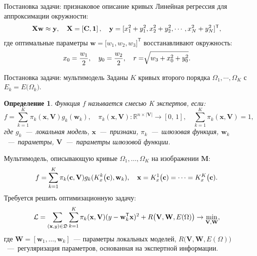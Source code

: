 \documentclass[10pt,pdf,hyperref={unicode}]{beamer}
\newtheorem{rusdefinition}{Определение}
\begin{document}
\begin{frame}{Постановка задачи: признаковое описание кривых}
Линейная регрессия для аппроксимации окружности:
\[
\setlength\abovedisplayskip{0pt}
\begin{aligned}
\textbf{X}\textbf{w} \approx \textbf{y},  \quad \textbf{X} = \left[\textbf{C}, \textbf{1}\right], \quad \textbf{y} = [x_1^2+y_1^2, x_2^2+y_2^2, \cdots, x_N^2+y_N^2]^{\mathsf{T}},
\end{aligned}
\setlength\belowdisplayskip{0pt}
\]
где оптимальные параметры $\textbf{w} = \bigr[w_1, w_2, w_3\bigr]^{\mathsf{T}}$ восстанавливают окружность:
\[
\setlength\abovedisplayskip{0pt}
\begin{aligned}
x_0 = \frac{w_1}{2}, \quad y_0 = \frac{w_2}{2}, \quad r = \sqrt[]{w_3+x_{0}^{2}+y_{0}^{2}}.
\end{aligned}
\setlength\belowdisplayskip{0pt}
\]


\end{frame}


\begin{frame}{Постановка задачи: мультимодель}
\justifying
Заданы $K$ кривых второго порядка $\Omega_1, \cdots, \Omega_K$ с $E_k = E\bigr(\Omega_k\bigr)$.

\begin{rusdefinition}
Функция $f$ называется смесью K экспертов, если:
\[
	f = \sum\limits_{k = 1}^{K}\pi_k(\mathbf{x}, \mathbf{V})g_k(\mathbf{w}_k),  \quad \pi_k(\mathbf{x}, \mathbf{V}): \mathbb{R}^{n\times |\mathbf{V}|} \rightarrow [0, \, 1], \quad \sum\limits_{k = 1}^{K}\pi_k(\mathbf{x}, \mathbf{V}) = 1, 
\]
где $g_k$~---~локальная модель, $\mathbf{x}$~---~признаки, $\pi_k$~---~шлюзовая функция, $\mathbf{w}_k$~---~параметры, $\mathbf{V}$~---~параметры шлюзовой функции.
\end{rusdefinition}

Мультимодель, описывающую кривые $\Omega_1, \dots, \Omega_K$ на изображении $\mathbf{M}$:
\[
\setlength\abovedisplayskip{0pt}
	f = \sum_{k = 1}^{K} \pi_k(\mathbf{c}, \mathbf{V})g_k(K^k_{x}\bigl(\mathbf{c}), \mathbf{w}_k), \quad \mathbf{x}=K^1_{x}\bigl(\mathbf{c})=\cdots=K^K_{x}\bigl(\mathbf{c}).
\setlength\belowdisplayskip{0pt}
\]
Требуется решить оптимизационную задачу:
\[
\setlength\abovedisplayskip{0pt}
\mathcal{L} = \sum\limits_{(\mathbf{x}, y) \in \mathfrak{D}} \sum\limits_{k = 1}^{K} \pi_k(\mathbf{x}, \mathbf{V})(y - \mathbf{w}_k^{\mathsf{T}}\mathbf{x})^2 + R\bigl(\mathbf{V}, \mathbf{W}, E(\Omega)\bigr) \rightarrow \min_{\mathbf{V}, \mathbf{W}},
\setlength\belowdisplayskip{0pt}
\]
где $\mathbf{W} = [\mathbf{w}_1, \dots, \mathbf{w}_k]$~--- параметры локальных моделей, $R\bigl(\mathbf{V}, \mathbf{W}, E(\Omega)\bigr)$~---~регуляризация параметров, основанная на экспертной информации.

\end{frame}
\end{document}
